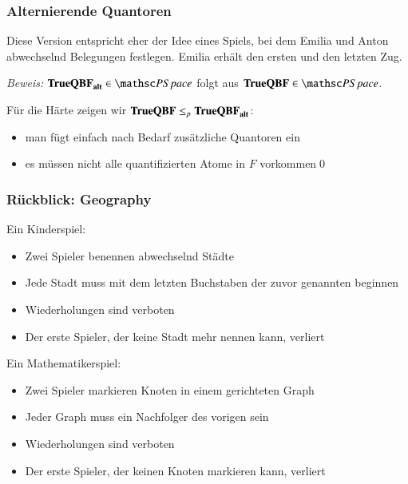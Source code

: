 \documentclass[onlymath]{beamer}
\begin{document}
\begin{frame}\frametitle{Alternierende Quantoren}



Diese Version entspricht eher der Idee eines Spiels, bei dem Emilia und Anton abwechselnd
Belegungen festlegen. Emilia erhält den ersten und den letzten Zug.\bigskip\pause


\pause\emph{Beweis:} $\Slang{TrueQBF}_{\Slang{alt}}\in\PSpace$ folgt aus $\Slang{TrueQBF}\in\PSpace$.\bigskip

Für die Härte zeigen wir $\textbf{\textcolor{black}{TrueQBF}}\leq_p\textbf{\textcolor{black}{TrueQBF}}_{\textbf{\textcolor{black}{alt}}}$:
\begin{itemize}
\item man fügt einfach nach Bedarf zusätzliche Quantoren ein
\item es müssen nicht alle quantifizierten Atome in $F$ vorkommen\qed
\end{itemize}

\end{frame}

\begin{frame}\frametitle{Rückblick: Geography}

\alert{Ein Kinderspiel:}
\begin{itemize}
\item Zwei Spieler benennen abwechselnd Städte
\item Jede Stadt muss mit dem letzten Buchstaben der zuvor genannten beginnen
\item Wiederholungen sind verboten
\item Der erste Spieler, der keine Stadt mehr nennen kann, verliert
\end{itemize}
\smallskip

\alert{Ein Mathematikerspiel:}
\begin{itemize}
\item Zwei Spieler markieren Knoten in einem gerichteten Graph
\item Jeder Graph muss ein Nachfolger des vorigen sein
\item Wiederholungen sind verboten
\item Der erste Spieler, der keinen Knoten markieren kann, verliert
\end{itemize}
\smallskip

{}

\end{frame}
\end{document}
